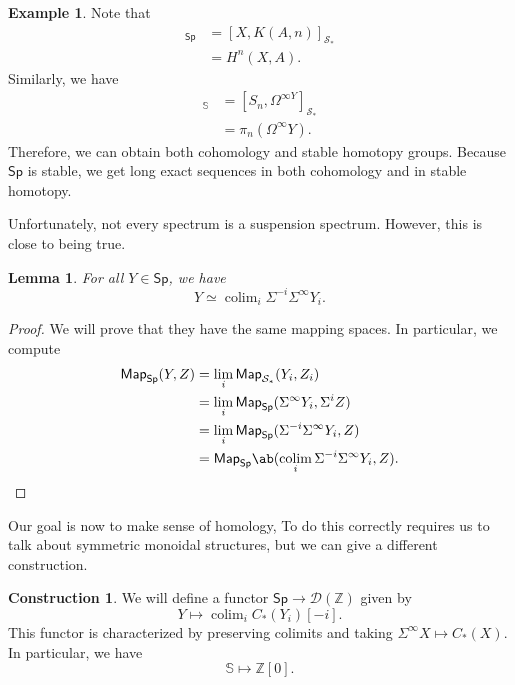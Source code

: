 \documentclass[10pt, oneside]{memoir}
\newtheorem{lem}[thm]{Lemma}
\theoremstyle{definition}
\newtheorem{con}[thm]{Construction}
\newtheorem{exm}[thm]{Example}
\theoremstyle{remark}
\theoremstyle{plain}
\theoremstyle{definition}
\theoremstyle{remark}
\newcommand{\Z}{\mathbb{Z}}
\newcommand{\bS}{\mathbb{S}}
\newcommand{\mc}[1]{\mathcal{#1}}
\newcommand{\ms}[1]{\mathsf{#1}}
\newcommand{\1}{\mathbf{1}}
\newcommand{\2}{\mathbf{2}}
\newcommand{\3}{\mathbf{3}}
\DeclareMathOperator*{\colim}{colim}
\begin{document}
\begin{exm}
    Note that
    \begin{align*}
        [\Sigma^{\infty} X, \Sigma^n HA]_{\ms{Sp}} &= [X, K(A, n)]_{\mc{S}_*} \\
        &= H^n(X, A).
    \end{align*}
    Similarly, we have
    \begin{align*}
        [\Sigma^n \bS, Y]_{\bS} &= [S_n, \Omega^{\infty Y}]_{\mc{S}_*} \\
        &= \pi_n (\Omega^{\infty} Y).
    \end{align*}
    Therefore, we can obtain both cohomology and stable homotopy groups. Because $\ms{Sp}$ is stable, we get long exact sequences in both cohomology and in stable homotopy.
\end{exm}

Unfortunately, not every spectrum is a suspension spectrum. However, this is close to being true.
\begin{lem}
    For all $Y \in \ms{Sp}$, we have
    \[ Y \simeq \colim_i \Sigma^{-i} \Sigma^{\infty} Y_i. \]
\end{lem}

\begin{proof}
    We will prove that they have the same mapping spaces. In particular, we compute
    \begin{align*}
        \ms{Map}_{\ms{Sp}}(Y, Z) &= \lim_i \ms{Map}_{\mc{S}_*}(Y_i, Z_i) \\
        &= \lim_i \ms{Map}_{\ms{Sp}} (\Sigma^{\infty} Y_i, \Sigma^i Z) \\
        &= \lim_i \ms{Map}_{\ms{Sp}} (\Sigma^{-i} \Sigma^{\infty} Y_i, Z) \\
        &= \ms{Map}_{\ms{Sp}} \ab(\colim_i \Sigma^{-i}\Sigma^{\infty} Y_i, Z).
    \end{align*}
\end{proof}

Our goal is now to make sense of homology, To do this correctly requires us to talk about symmetric monoidal structures, but we can give a different construction.

\begin{con}
    We will define a functor $\ms{Sp} \to \mc{D}(\Z)$ given by
    \[ Y \mapsto \colim_i C_*(Y_i) [-i]. \]
    This functor is characterized by preserving colimits and taking $\Sigma^{\infty} X \mapsto C_*(X)$. In particular, we have
    \[ \bS \mapsto \Z[0]. \]
\end{con}
\end{document}
